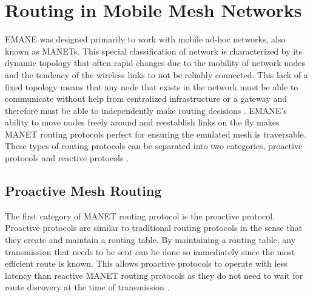 \section{Routing in Mobile Mesh Networks}
EMANE was designed primarily to work with mobile ad-hoc networks, also known as MANETs.
This special classification of network is characterized by its dynamic topology that often rapid changes due to the mobility of network nodes and the tendency of the wireless links to not be reliably connected.
This lack of a fixed topology means that any node that exists in the network must be able to communicate without help from centralized infrastructure or a gateway and therefore must be able to independently make routing decisions \cite{puri2014routing}.
EMANE's ability to move nodes freely around and reestablish links on the fly makes MANET routing protocols perfect for ensuring the emulated mesh is traversable.
These types of routing protocols can be separated into two categories, proactive protocols and reactive protocols \cite{kaur2014performance}.

\subsection{Proactive Mesh Routing}
The first category of MANET routing protocol is the proactive protocol.
Proactive protocols are similar to traditional routing protocols in the sense that they create and maintain a routing table.
By maintaining a routing table, any transmission that needs to be sent can be done so immediately since the most efficient route is known.
This allows proactive protocols to operate with less latency than reactive MANET routing protocols as they do not need to wait for route discovery at the time of transmission \cite{kaur2014performance}.


            


